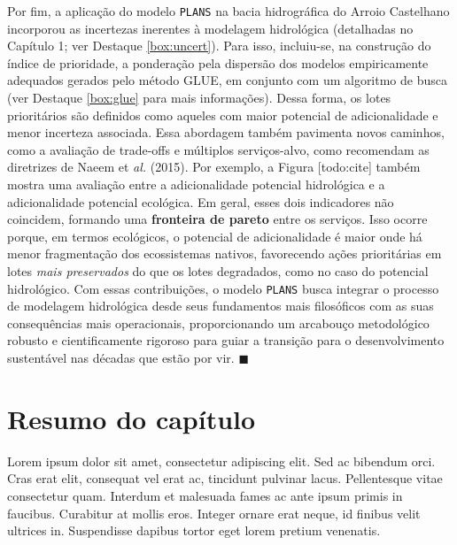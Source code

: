 \documentclass[./main.tex]{subfiles}
\begin{document}
\par Por fim, a aplicação do modelo \texttt{PLANS} na bacia hidrográfica do Arroio Castelhano incorporou as incertezas inerentes à modelagem hidrológica (detalhadas no Capítulo 1; ver Destaque \ref{box:uncert}). Para isso, incluiu-se, na construção do índice de prioridade, a ponderação pela dispersão dos modelos empiricamente adequados gerados pelo método GLUE, em conjunto com um algoritmo de busca (ver Destaque \ref{box:glue} para mais informações). Dessa forma, os lotes prioritários são definidos como aqueles com maior potencial de adicionalidade e menor incerteza associada. Essa abordagem também pavimenta novos caminhos, como a avaliação de trade-offs e múltiplos serviços-alvo, como recomendam as diretrizes de Naeem et \textit{al.} (2015). Por exemplo, a Figura [todo:cite] também mostra uma avaliação entre a adicionalidade potencial hidrológica e a adicionalidade potencial ecológica. Em geral, esses dois indicadores não coincidem, formando uma \textbf{fronteira de pareto} entre os serviços. Isso ocorre porque, em termos ecológicos, o potencial de adicionalidade é maior onde há menor fragmentação dos ecossistemas nativos, favorecendo ações prioritárias em lotes \textit{mais preservados} do que os lotes degradados, como no caso do potencial hidrológico. Com essas contribuições, o modelo \texttt{PLANS} busca integrar o processo de modelagem hidrológica desde seus fundamentos mais filosóficos com as suas consequências mais operacionais, proporcionando um arcabouço metodológico robusto e cientificamente rigoroso para guiar a transição para o desenvolvimento sustentável nas décadas que estão por vir. $\blacksquare$

\clearpage

\section{Resumo do capítulo}

\par Lorem ipsum dolor sit amet, consectetur adipiscing elit. Sed ac bibendum orci. Cras erat elit, consequat vel erat ac, tincidunt pulvinar lacus. Pellentesque vitae consectetur quam. Interdum et malesuada fames ac ante ipsum primis in faucibus. Curabitur at mollis eros. Integer ornare erat neque, id finibus velit ultrices in. Suspendisse dapibus tortor eget lorem pretium venenatis.
\end{document}
